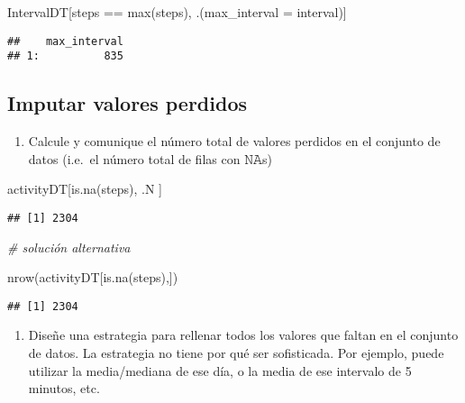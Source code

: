 \documentclass[
]{article}
\newenvironment{Shaded}{\begin{snugshade}}{\end{snugshade}}
\newcommand{\AttributeTok}[1]{\textcolor[rgb]{0.77,0.63,0.00}{#1}}
\newcommand{\CommentTok}[1]{\textcolor[rgb]{0.56,0.35,0.01}{\textit{#1}}}
\newcommand{\FunctionTok}[1]{\textcolor[rgb]{0.00,0.00,0.00}{#1}}
\newcommand{\NormalTok}[1]{#1}
\newcommand{\SpecialCharTok}[1]{\textcolor[rgb]{0.00,0.00,0.00}{#1}}
\providecommand{\tightlist}{%
  \setlength{\itemsep}{0pt}\setlength{\parskip}{0pt}}
\begin{document}
\begin{Shaded}
\begin{Highlighting}[]
\NormalTok{IntervalDT[steps }\SpecialCharTok{==} \FunctionTok{max}\NormalTok{(steps), .(}\AttributeTok{max\_interval =}\NormalTok{ interval)]}
\end{Highlighting}
\end{Shaded}

\begin{verbatim}
##    max_interval
## 1:          835
\end{verbatim}

\hypertarget{imputar-valores-perdidos}{%
\subsection{Imputar valores perdidos}\label{imputar-valores-perdidos}}

\begin{enumerate}
\def\labelenumi{\arabic{enumi}.}
\tightlist
\item
  Calcule y comunique el número total de valores perdidos en el conjunto
  de datos (i.e.~el número total de filas con 𝙽𝙰s)
\end{enumerate}

\begin{Shaded}
\begin{Highlighting}[]
\NormalTok{activityDT[}\FunctionTok{is.na}\NormalTok{(steps), .N ]}
\end{Highlighting}
\end{Shaded}

\begin{verbatim}
## [1] 2304
\end{verbatim}

\begin{Shaded}
\begin{Highlighting}[]
 \CommentTok{\# solución alternativa}

\FunctionTok{nrow}\NormalTok{(activityDT[}\FunctionTok{is.na}\NormalTok{(steps),])}
\end{Highlighting}
\end{Shaded}

\begin{verbatim}
## [1] 2304
\end{verbatim}

\begin{enumerate}
\def\labelenumi{\arabic{enumi}.}
\setcounter{enumi}{1}
\tightlist
\item
  Diseñe una estrategia para rellenar todos los valores que faltan en el
  conjunto de datos. La estrategia no tiene por qué ser sofisticada. Por
  ejemplo, puede utilizar la media/mediana de ese día, o la media de ese
  intervalo de 5 minutos, etc.
\end{enumerate}
\end{document}
